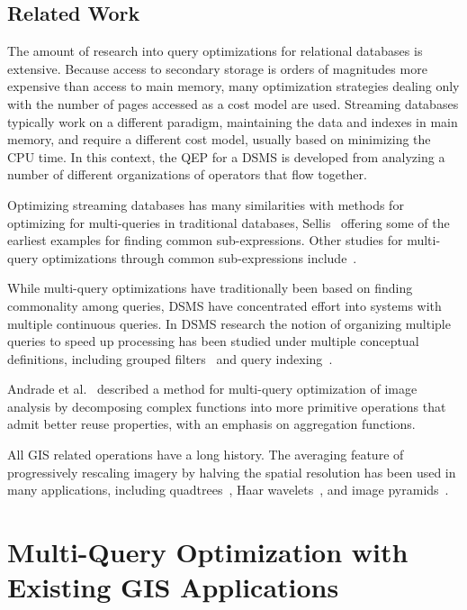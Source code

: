 \documentclass{ucdthesis}       %
\begin{document}
\section{Related Work}

The amount of research into query optimizations for relational
databases is extensive.  Because access to secondary storage is orders
of magnitudes more expensive than access to main memory, many optimization
strategies dealing only with the number of pages accessed as a cost
model are used.  Streaming databases typically work on a different
paradigm, maintaining the data and indexes in main memory, and require
a different cost model, usually based on minimizing the CPU time.  In
this context, the \ac{QEP} for a \ac{DSMS} is developed from analyzing
a number of different organizations of operators that flow together.

Optimizing streaming databases has many similarities with methods for
optimizing for multi-queries in traditional databases,
Sellis~\cite{sellis90multip-query} offering some of the earliest
examples for finding common sub-expressions.  Other studies for
multi-query optimizations through common sub-expressions
include~\cite{graef93volcan-optim,pellen97compl-trans,roy00effic}.

While multi-query optimizations have traditionally been based on
finding commonality among queries, \ac{DSMS} have concentrated effort
into systems with multiple continuous queries.  In \ac{DSMS} research
the notion of organizing multiple queries to speed up processing has
been studied under multiple conceptual definitions, including grouped
filters~\cite{madden02contin-adapt} and query
indexing~\cite{prabhakar02qindex}.

Andrade et al.~\cite{andrad03exploit-funct} described a method for
multi-query optimization of image analysis by decomposing complex
functions into more primitive operations that admit better reuse
properties, with an emphasis on aggregation functions.

All \ac{GIS} related operations have a long history.  The averaging
feature of progressively rescaling imagery by halving the spatial
resolution has been used in many applications, including
quadtrees~\cite{wiki06}, Haar wavelets~\cite{wiki06}, and image
pyramids~\cite{kropatsch91image-pyram-and-curves}.

\chapter{Multi-Query Optimization with Existing GIS Applications}
\label{cha:existing}
\end{document}
